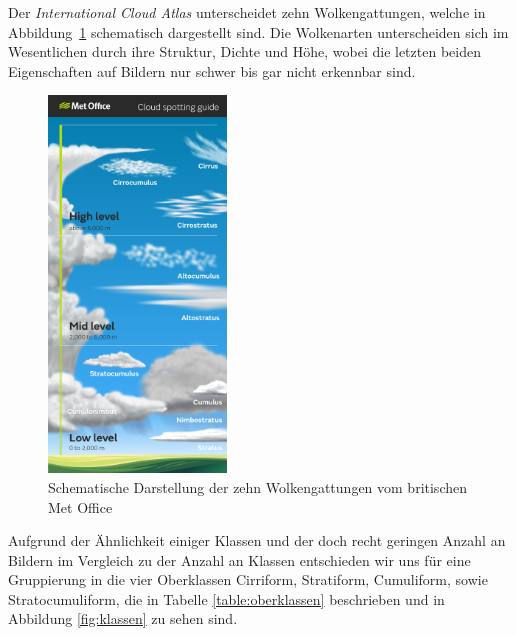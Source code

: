 \documentclass[a4,german]{article}
\begin{document}
Der \textit{International Cloud Atlas} unterscheidet zehn Wolkengattungen, welche in Abbildung~\ref{fig:cloudtypes} schematisch dargestellt sind.
Die Wolkenarten unterscheiden sich im Wesentlichen durch ihre Struktur, Dichte und Höhe, wobei die letzten beiden Eigenschaften auf Bildern nur schwer bis gar nicht erkennbar sind.

\begin{figure}[h!]
\centering
\includegraphics[height=10cm,keepaspectratio]{Cloud_infographic-01.png}
\caption{Schematische Darstellung der zehn Wolkengattungen vom britischen Met Office\cite{metoffice}}
    \label{fig:cloudtypes}
\end{figure}

Aufgrund der Ähnlichkeit einiger Klassen und der doch recht geringen Anzahl an Bildern im Vergleich zu der Anzahl an Klassen entschieden wir uns für eine Gruppierung in die vier Oberklassen \glqq Cirriform\grqq, \glqq Stratiform\grqq, \glqq Cumuliform\grqq, sowie \glqq Stratocumuliform\grqq, die in Tabelle \ref{table:oberklassen} beschrieben und in Abbildung \ref{fig:klassen} zu sehen sind.
\end{document}
